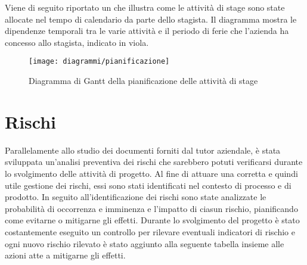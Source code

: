 Viene di seguito riportato un  che illustra come le attività di stage sono state allocate nel tempo di calendario da parte dello stagista. Il diagramma mostra le dipendenze temporali tra le varie attività e il periodo di ferie che l'azienda ha concesso allo stagista, indicato in viola.

\begin{figure}[!h] 
    \centering 
    \texttt{[image: diagrammi/pianificazione]} 
    \caption{Diagramma di Gantt della pianificazione delle attività di stage}
\end{figure}

\newpage

\section{Rischi}

Parallelamente allo studio dei documenti forniti dal tutor aziendale, è stata sviluppata un'analisi preventiva dei rischi che sarebbero potuti verificarsi durante lo svolgimento delle attività di progetto. Al fine di attuare una corretta e quindi utile gestione dei rischi, essi sono stati identificati nel contesto di processo e di prodotto. In seguito all'identificazione dei rischi sono state analizzate le probabilità di occorrenza e imminenza e l'impatto di ciasun rischio, pianificando come evitarne o mitigarne gli effetti. Durante lo svolgimento del progetto è stato costantemente eseguito un controllo per rilevare eventuali indicatori di rischio e ogni nuovo rischio rilevato è stato aggiunto alla seguente tabella insieme alle azioni atte a mitigarne gli effetti.

